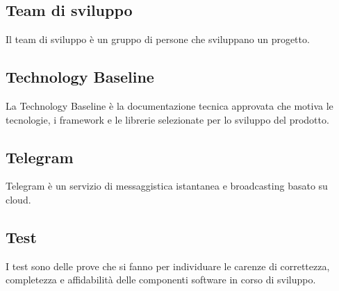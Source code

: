 
\subsection*{Team di sviluppo}
Il team di sviluppo è un gruppo di persone che sviluppano un progetto.

\subsection*{Technology Baseline}
La Technology Baseline è la documentazione tecnica approvata che motiva le tecnologie, i framework e le librerie selezionate per lo sviluppo del prodotto.

\subsection*{Telegram}
Telegram è un servizio di messaggistica istantanea e broadcasting basato su cloud.

\subsection*{Test}
I test sono delle prove che si fanno per individuare le carenze di correttezza, completezza e affidabilità delle componenti software in corso di sviluppo.


